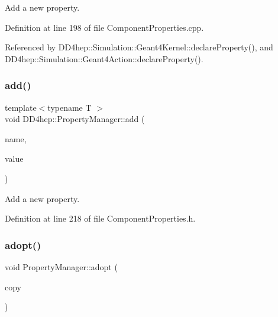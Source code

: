 Add a new property. 



Definition at line 198 of file Component\+Properties.\+cpp.



Referenced by D\+D4hep\+::\+Simulation\+::\+Geant4\+Kernel\+::declare\+Property(), and D\+D4hep\+::\+Simulation\+::\+Geant4\+Action\+::declare\+Property().

\hypertarget{class_d_d4hep_1_1_property_manager_adca1582e1f5e71fcd8782d0503897289}{}\label{class_d_d4hep_1_1_property_manager_adca1582e1f5e71fcd8782d0503897289} 
\subsubsection{\texorpdfstring{add()}{add()}\hspace{0.1cm}{\footnotesize\ttfamily [2/2]}}
{\footnotesize\ttfamily template$<$typename T $>$ \\
void D\+D4hep\+::\+Property\+Manager\+::add (\begin{DoxyParamCaption}\item[{const std\+::string \&}]{name,  }\item[{\hyperlink{class_t}{T} \&}]{value }\end{DoxyParamCaption})\hspace{0.3cm}{\ttfamily [inline]}}



Add a new property. 



Definition at line 218 of file Component\+Properties.\+h.

\hypertarget{class_d_d4hep_1_1_property_manager_aaf21d1b86b833d99d004a77db1872141}{}\label{class_d_d4hep_1_1_property_manager_aaf21d1b86b833d99d004a77db1872141} 
\subsubsection{\texorpdfstring{adopt()}{adopt()}}
{\footnotesize\ttfamily void Property\+Manager\+::adopt (\begin{DoxyParamCaption}\item[{const \hyperlink{class_d_d4hep_1_1_property_manager}{Property\+Manager} \&}]{copy }\end{DoxyParamCaption})}



